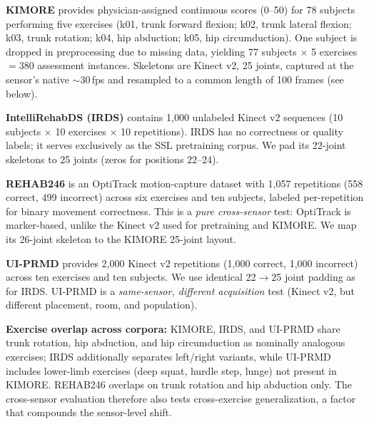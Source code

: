 \documentclass[10pt,journal]{IEEEtran}
\begin{document}
\textbf{KIMORE} \cite{capecci2019kimore} provides physician-assigned continuous scores (0--50) for 78 subjects performing five exercises (k01, trunk forward flexion; k02, trunk lateral flexion; k03, trunk rotation; k04, hip abduction; k05, hip circumduction). One subject is dropped in preprocessing due to missing data, yielding 77 subjects $\times$ 5 exercises $= 380$ assessment instances. Skeletons are Kinect v2, 25 joints, captured at the sensor's native $\sim$30\,fps and resampled to a common length of 100 frames (see below).

\textbf{IntelliRehabDS (IRDS)} \cite{capecci2019kimore} contains 1,000 unlabeled Kinect v2 sequences (10 subjects $\times$ 10 exercises $\times$ 10 repetitions). IRDS has no correctness or quality labels; it serves exclusively as the SSL pretraining corpus. We pad its 22-joint skeletons to 25 joints (zeros for positions 22--24).

\textbf{REHAB246} \cite{rehab246} is an OptiTrack motion-capture dataset with 1,057 repetitions (558 correct, 499 incorrect) across six exercises and ten subjects, labeled per-repetition for binary movement correctness. This is a \emph{pure cross-sensor} test: OptiTrack is marker-based, unlike the Kinect v2 used for pretraining and KIMORE. We map its 26-joint skeleton to the KIMORE 25-joint layout.

\textbf{UI-PRMD} \cite{vakanski2018uiprmd} provides 2,000 Kinect v2 repetitions (1,000 correct, 1,000 incorrect) across ten exercises and ten subjects. We use identical 22$\to$25 joint padding as for IRDS. UI-PRMD is a \emph{same-sensor, different acquisition} test (Kinect v2, but different placement, room, and population).

\textbf{Exercise overlap across corpora:} KIMORE, IRDS, and UI-PRMD share trunk rotation, hip abduction, and hip circumduction as nominally analogous exercises; IRDS additionally separates left/right variants, while UI-PRMD includes lower-limb exercises (deep squat, hurdle step, lunge) not present in KIMORE. REHAB246 overlaps on trunk rotation and hip abduction only. The cross-sensor evaluation therefore also tests cross-exercise generalization, a factor that compounds the sensor-level shift.
\end{document}
